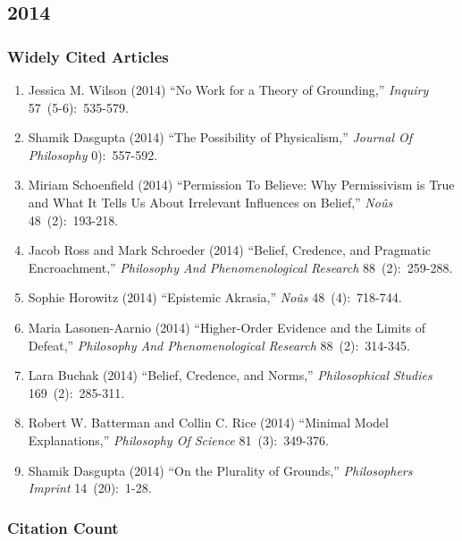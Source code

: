 \documentclass[
  10pt,
  letterpaper,
  DIV=11,
  numbers=noendperiod,
  twoside]{scrartcl}
\providecommand{\tightlist}{%
  \setlength{\itemsep}{0pt}\setlength{\parskip}{0pt}}\usepackage{longtable,booktabs,array}
\begin{document}
\newpage

\subsection{2014}\label{sec-s2014}

\subsubsection*{Widely Cited Articles}\label{widely-cited-articles-58}

\begin{enumerate}
\def\labelenumi{\arabic{enumi}.}
\tightlist
\item
  Jessica M. Wilson (2014) ``No Work for a Theory of Grounding,''
  \emph{Inquiry} 57~(5-6):~535-579.
\item
  Shamik Dasgupta (2014) ``The Possibility of Physicalism,''
  \emph{Journal Of Philosophy} 0):~557-592.
\item
  Miriam Schoenfield (2014) ``Permission To Believe: Why Permissivism is
  True and What It Tells Us About Irrelevant Influences on Belief,''
  \emph{Noûs} 48~(2):~193-218.
\item
  Jacob Ross and Mark Schroeder (2014) ``Belief, Credence, and Pragmatic
  Encroachment,'' \emph{Philosophy And Phenomenological Research}
  88~(2):~259-288.
\item
  Sophie Horowitz (2014) ``Epistemic Akrasia,'' \emph{Noûs}
  48~(4):~718-744.
\item
  Maria Lasonen-Aarnio (2014) ``Higher-Order Evidence and the Limits of
  Defeat,'' \emph{Philosophy And Phenomenological Research}
  88~(2):~314-345.
\item
  Lara Buchak (2014) ``Belief, Credence, and Norms,''
  \emph{Philosophical Studies} 169~(2):~285-311.
\item
  Robert W. Batterman and Collin C. Rice (2014) ``Minimal Model
  Explanations,'' \emph{Philosophy Of Science} 81~(3):~349-376.
\item
  Shamik Dasgupta (2014) ``On the Plurality of Grounds,''
  \emph{Philosophers Imprint} 14~(20):~1-28.
\end{enumerate}

\subsubsection*{Citation Count}\label{sec-count-2014}
\end{document}
